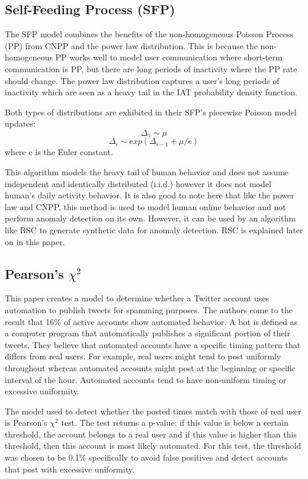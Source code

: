 \documentclass[11pt, oneside]{article}   	%
\begin{document}
\subsection*{Self-Feeding Process (SFP) }

\quad The SFP model \cite{sfp} combines the benefits of the non-homogeneous Poisson Process (PP) from CNPP and the power law distribution.
This is because the non-homogeneous PP works well to model user communication where short-term communication is PP, but there are long periods of inactivity where the PP rate should change.
The power law distribution captures a user's long periods of inactivity which are seen as a heavy tail in the IAT probability density function.

\quad Both types of distributions are exhibited in their SFP's piecewise Poisson model updates:
$$ \Delta_1 \sim \mu $$
$$ \Delta_i \sim exp(\Delta_{i-1} + \mu / e) $$
where e is the Euler constant.

\quad This algorithm models the heavy tail of human behavior and does not assume independent and identically distributed (i.i.d.) however it does not model human's daily activity behavior. It is also good to note here that like the power law and CNPP, this method is used to model human online behavior and not perform anomaly detection on its own. However, it can be used by an algorithm like RSC \cite{rsc} to generate synthetic data for anomaly detection. RSC is explained later on in this paper.

\subsection*{Pearson's $\chi^2$}

\quad This paper \cite{pearson} creates a model to determine whether a Twitter account uses automation to publish tweets for spamming purposes. 
The authors come to the result that 16\% of active accounts show automated behavior.
A bot is defined as a computer program that automatically publishes a significant portion of their tweets.
They believe that automated accounts have a specific timing pattern that differs from real users.
For example, real users might tend to post uniformly throughout whereas automated accounts might post at the beginning or specific interval of the hour.
Automated accounts tend to have non-uniform timing or excessive uniformity.

\quad The model used to detect whether the posted times match with those of real user is Pearson's $\chi^2$ test.
The test returns a p-value; if this value is below a certain threshold, the account belongs to a real user and if this value is higher than this threshold, then this account is most likely automated.
For this test, the threshold was chosen to be 0.1\% specifically to avoid false positives and detect accounts that post with excessive uniformity.
\end{document}
